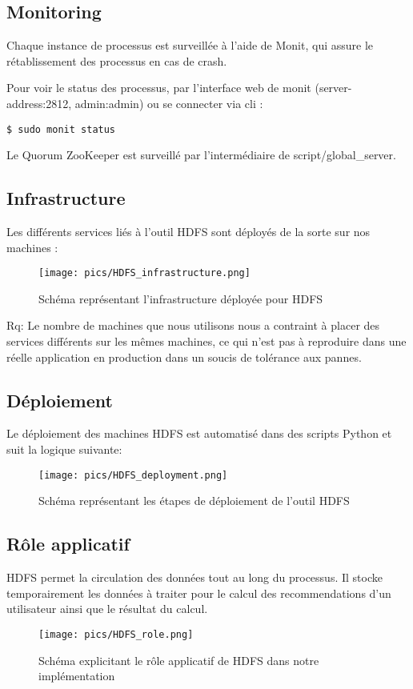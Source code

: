 \subsection{Monitoring}

Chaque instance de processus est surveillée à l'aide de Monit, qui assure le rétablissement des processus en cas de crash.

Pour voir le status des processus, par l'interface web de monit (server-address:2812, admin:admin) ou se connecter via cli :

\begin{lstlisting}
$ sudo monit status
\end{lstlisting}


Le Quorum ZooKeeper est surveillé par l'intermédiaire de script/global\_server.

\subsection{Infrastructure}
Les différents services liés à l'outil HDFS sont déployés de la sorte sur nos machines :

\begin{figure}[h]
    \centering
    \texttt{[image: pics/HDFS\_infrastructure.png]}
    \caption{Schéma représentant l'infrastructure déployée pour HDFS}
\end{figure}
\FloatBarrier

Rq: Le nombre de machines que nous utilisons nous a contraint à placer des services différents sur les mêmes machines, ce qui n'est pas à reproduire dans une réelle application en production dans un soucis de tolérance aux pannes.

\subsection{Déploiement}

Le déploiement des machines HDFS est automatisé dans des scripts Python et suit la logique suivante: 

\begin{figure}[h]
    \centering
    \texttt{[image: pics/HDFS\_deployment.png]}
    \caption{Schéma représentant les étapes de déploiement de l'outil HDFS}
\end{figure}
\FloatBarrier

\subsection{Rôle applicatif}

HDFS permet la circulation des données tout au long du processus. Il stocke temporairement les données à traiter pour le calcul des recommendations d'un utilisateur ainsi que le résultat du calcul.

\begin{figure}[h]
    \centering
    \texttt{[image: pics/HDFS\_role.png]}
    \caption{Schéma explicitant le rôle applicatif de HDFS dans notre implémentation}
\end{figure}
\FloatBarrier